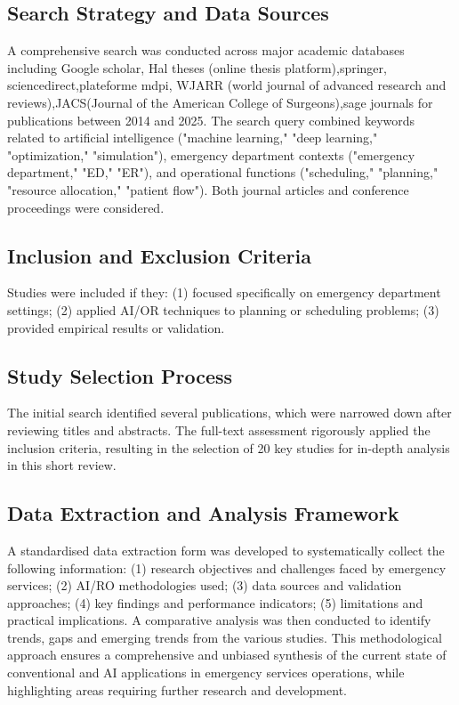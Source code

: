 \documentclass[runningheads]{llncs}
\begin{document}
\subsection{Search Strategy and Data Sources}
A comprehensive search was conducted across major academic databases including Google scholar, Hal theses (online thesis platform),springer, sciencedirect,plateforme mdpi, WJARR (world journal of advanced research and reviews),JACS(Journal of the American College of Surgeons),sage journals for publications between 2014 and 2025. The search query combined keywords related to artificial intelligence ("machine learning," "deep learning," "optimization," "simulation"), emergency department contexts ("emergency department," "ED," "ER"), and operational functions ("scheduling," "planning," "resource allocation," "patient flow"). Both journal articles and conference proceedings were considered.
\subsection{Inclusion and Exclusion Criteria}
Studies were included if they: (1) focused specifically on emergency department settings; (2) applied AI/OR techniques to planning or scheduling problems; (3) provided empirical results or validation.
\subsection{Study Selection Process}
The initial search identified several publications, which were narrowed down after reviewing titles and abstracts. The full-text assessment rigorously applied the inclusion criteria, resulting in the selection of 20 key studies for in-depth analysis in this short review.
\subsection{Data Extraction and Analysis Framework}
A standardised data extraction form was developed to systematically collect the following information: (1) research objectives and challenges faced by emergency services; (2) AI/RO methodologies used; (3) data sources and validation approaches; (4) key findings and performance indicators; (5) limitations and practical implications. A comparative analysis was then conducted to identify trends, gaps and emerging trends from the various studies.
This methodological approach ensures a comprehensive and unbiased synthesis of the current state of conventional and AI applications in emergency services operations, while highlighting areas requiring further research and development.
\end{document}
